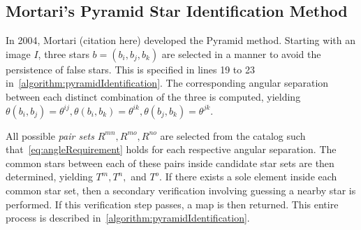 \subsection{Mortari's Pyramid Star Identification Method}\label{subsec:mortari'sPyramidStarIdentificationMethod}
In 2004, Mortari (citation here) developed the Pyramid method.
Starting with an image $I$, three stars $b = (b_i, b_j, b_k)$ are selected in a manner to avoid the persistence of
false stars.
This is specified in lines 19 to 23 in~\autoref{algorithm:pyramidIdentification}.
The corresponding angular separation between each distinct combination of the three is computed, yielding $\theta
(b_i, b_j) = \theta^{ij}, \theta(b_i, b_k) = \theta^{ik}, \theta(b_j, b_k) = \theta^{jk}$.

All possible \textit{pair sets} $R^{mn}, R^{mo}, R^{no}$ are selected from the catalog such
that~\autoref{eq:angleRequirement} holds for each respective angular separation.
The common stars between each of these pairs inside candidate star sets are then determined, yielding $T^m, T^n, $ and
$T^o$.
If there exists a sole element inside each common star set, then a secondary verification involving guessing a nearby
star is performed.
If this verification step passes, a map is then returned.
This entire process is described in~\autoref{algorithm:pyramidIdentification}.

